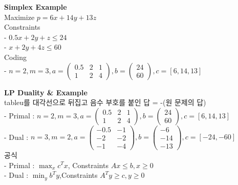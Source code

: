 \textbf{Simplex Example}\\
Maximize $p = 6x + 14y + 13z$\\
Constraints \\
- $0.5x + 2y + z \leq 24$\\
- $x + 2y + 4z \leq 60$\\
Coding\\
- $n = 2, m = 3, a = \begin{pmatrix} 0.5 & 2 & 1 \\ 1 & 2 & 4 \end{pmatrix}, b = \begin{pmatrix} 24 \\ 60 \end{pmatrix}, c = [6, 14, 13]$

\noindent
\textbf{LP Duality \& Example}\\
tableu를 대각선으로 뒤집고 음수 부호를 붙인 답 = -(원 문제의 답)\\
- Primal : $n = 2, m = 3, a = \begin{pmatrix} 0.5 & 2 & 1 \\ 1 & 2 & 4 \end{pmatrix}, b = \begin{pmatrix} 24 \\ 60 \end{pmatrix}, c = [6, 14, 13]$\\
- Dual : $n = 3, m = 2, a = \begin{pmatrix} -0.5 & -1 \\ -2 & -2 \\ -1 & -4 \end{pmatrix}, b = \begin{pmatrix} -6 \\ -14 \\ -13 \end{pmatrix}, c = [-24, -60]$\\
공식\\
- Primal : $\max_{x} c^Tx$, Constraints $Ax \leq b, x \geq 0$\\
- Dual : $\min_{y} b^Ty$,Constraints $A^Ty \geq c, y \geq 0$ 